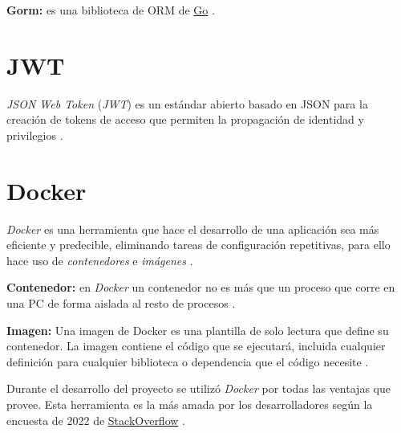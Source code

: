 \textbf{Gorm:} es una biblioteca de ORM de \href{https://go.dev/}{Go} \cite{gorm}.

\section{JWT}

\textit{JSON Web Token} (\textit{JWT}) es un estándar abierto basado en JSON para la creación de tokens de acceso que permiten la propagación de identidad y privilegios \cite{jwt}.

\section{Docker}

\textit{Docker} es una herramienta que hace el desarrollo de una aplicación sea más eficiente y predecible, eliminando tareas de configuración repetitivas, para ello hace uso de \textit{contenedores} e \textit{imágenes} \cite{docker}.
\newline

\textbf{Contenedor:} en \textit{Docker} un contenedor no es más que un proceso que corre en una PC de forma aislada al resto de procesos \cite{docker_docs}.
\newline

\textbf{Imagen:} Una imagen de Docker es una plantilla de solo lectura que define su contenedor. La imagen contiene el código que se ejecutará, incluida cualquier definición para cualquier biblioteca o dependencia que el código necesite \cite{docker_docs}.
\newline

Durante el desarrollo del proyecto se utilizó \textit{Docker} por todas las ventajas que provee. Esta herramienta es la más amada por los desarrolladores según la encuesta de 2022 de \href{https://stackoverflow.com/}{StackOverflow} \cite{encuesta2022}.

